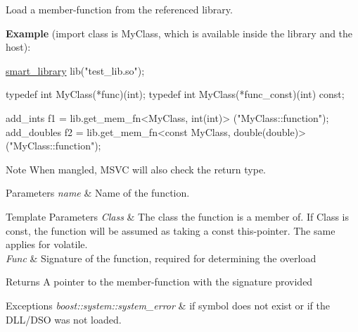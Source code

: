 Load a member-\/function from the referenced library.

{\bfseries Example} (import class is My\+Class, which is available inside the library and the host)\+:


\begin{DoxyCode}
\hyperlink{a01712_af1fa4c4ed871e889f92f4c11d574d91f}{smart\_library} lib(\textcolor{stringliteral}{"test\_lib.so"});

\textcolor{keyword}{typedef} \textcolor{keywordtype}{int}      MyClass(*func)(int);
\textcolor{keyword}{typedef} \textcolor{keywordtype}{int}   MyClass(*func\_const)(int) \textcolor{keyword}{const};

add\_ints     f1 = lib.get\_mem\_fn<MyClass, int(\textcolor{keywordtype}{int})>              (\textcolor{stringliteral}{"MyClass::function"});
add\_doubles  f2 = lib.get\_mem\_fn<\textcolor{keyword}{const} MyClass, double(\textcolor{keywordtype}{double})>(\textcolor{stringliteral}{"MyClass::function"});
\end{DoxyCode}


\begin{DoxyNote}{Note}
When mangled, M\+S\+VC will also check the return type.
\end{DoxyNote}

\begin{DoxyParams}{Parameters}
{\em name} & Name of the function. \\
\hline
\end{DoxyParams}

\begin{DoxyTemplParams}{Template Parameters}
{\em Class} & The class the function is a member of. If Class is const, the function will be assumed as taking a const this-\/pointer. The same applies for volatile. \\
\hline
{\em Func} & Signature of the function, required for determining the overload \\
\hline
\end{DoxyTemplParams}
\begin{DoxyReturn}{Returns}
A pointer to the member-\/function with the signature provided
\end{DoxyReturn}

\begin{DoxyExceptions}{Exceptions}
{\em boost\+::system\+::system\+\_\+error} & if symbol does not exist or if the D\+L\+L/\+D\+SO was not loaded. \\
\hline
\end{DoxyExceptions}
\mbox{\label{a01712_a8f711a4eb7118129a2826d61abbbf5a3}} 
